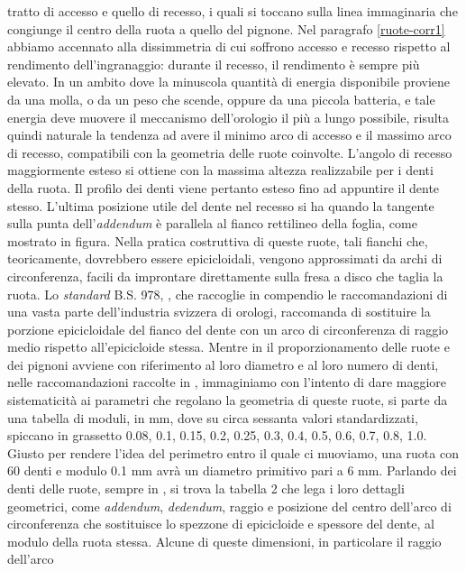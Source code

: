 tratto di accesso e quello di recesso, i quali si toccano sulla
linea immaginaria che congiunge il centro della ruota a quello del
pignone.
Nel paragrafo \ref{ruote-corr1} abbiamo accennato alla dissimmetria
di cui soffrono accesso e recesso rispetto al rendimento dell'ingranaggio:
durante il recesso, il rendimento \`e sempre pi\`u elevato.
In un ambito dove la minuscola quantit\`a di energia disponibile proviene da
una molla, o da un peso che scende, oppure da una piccola batteria, e
tale energia deve muovere il meccanismo dell'orologio il pi\`u a lungo
possibile, risulta quindi naturale 
la tendenza ad avere il minimo arco di accesso e il massimo
arco di recesso, compatibili con la geometria delle ruote coinvolte.
L'angolo di recesso maggiormente esteso
si ottiene con la massima altezza realizzabile per i denti della ruota.
Il profilo dei denti viene pertanto esteso fino ad appuntire il dente
stesso. L'ultima posizione utile del dente nel recesso si ha quando la
tangente sulla punta dell'{\em addendum} \`e parallela al fianco rettilineo della
foglia, come mostrato in figura.
Nella pratica costruttiva di queste ruote, tali fianchi che,
teoricamente, dovrebbero essere epicicloidali,
 vengono approssimati da archi di circonferenza,
facili da improntare direttamente sulla fresa a disco che taglia la
ruota.  Lo {\em standard}
 B.S. 978, \cite{bs978}, che raccoglie in compendio le raccomandazioni
di una vasta parte dell'industria svizzera di orologi, raccomanda di sostituire
la porzione epicicloidale del fianco del dente con un arco di circonferenza di
raggio medio rispetto all'epicicloide stessa. Mentre in \cite{grossmann}
il proporzionamento delle ruote e dei pignoni avviene con riferimento
al loro diametro e al  loro numero di denti, nelle raccomandazioni raccolte
in \cite{bs978}, immaginiamo
con l'intento di dare maggiore sistematicit\`a ai parametri che regolano
la geometria di queste ruote, si parte da una tabella di moduli, in mm, 
dove su circa sessanta valori standardizzati, spiccano in grassetto
0.08, 0.1, 0.15, 0.2, 0.25, 0.3, 0.4, 0.5, 0.6, 0.7, 0.8, 1.0.
Giusto per rendere l'idea del perimetro entro il quale ci muoviamo,
una ruota con 60 denti e modulo 0.1 mm avr\`a un diametro primitivo pari
a 6 mm. Parlando dei denti delle ruote, sempre in \cite{bs978}, si trova
la tabella 2 che lega i loro dettagli geometrici,
 come {\em addendum}, {\em dedendum},
raggio e posizione del centro dell'arco di circonferenza che sostituisce
lo spezzone di epicicloide e spessore del dente, al modulo
della ruota stessa.
Alcune di queste dimensioni, in particolare il raggio dell'arco
